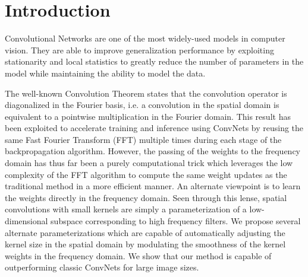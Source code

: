 \documentclass{article}
\begin{document}
 


\begin{abstract} 

\end{abstract} 

\section{Introduction}

Convolutional Networks are one of the most widely-used models in computer vision. 
They are able to improve generalization performance by exploiting stationarity and local statistics to greatly reduce the number of parameters in the model while maintaining the ability to model the data. 

The well-known Convolution Theorem states that the convolution operator is diagonalized in the Fourier basis, i.e. a convolution in the spatial domain is equivalent to a pointwise multiplication in the Fourier domain. 
This result has been exploited to accelerate training and inference using ConvNets by reusing the same Fast Fourier Transform (FFT) multiple times during each stage of the backpropagation algorithm.
However, the passing of the weights to the frequency domain has thus far been a purely computational trick which leverages the low complexity of the FFT algorithm to compute the same weight updates as the traditional method in a more efficient manner.
An alternate viewpoint is to learn the weights directly in the frequency domain. 
Seen through this lense, spatial convolutions with small kernels are simply a parameterization of a low-dimensional subspace corresponding to high frequency filters. 
We propose several alternate parameterizations which are capable of automatically adjusting the kernel size in the spatial domain by modulating the smoothness of the kernel weights in the frequency domain. 
We show that our method is capable of outperforming classic ConvNets for large image sizes. 
\end{document}
